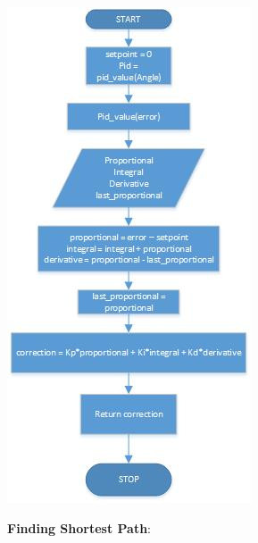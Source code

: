 \documentclass[report]{res}
\begin{document}
	\begin{center}
	\includegraphics[scale = 1.3]{graphics/drawing2.jpg}\\
	\end{center}
	
	\pagebreak
	
	
	\textbf{\Large Finding Shortest Path}:\\ \\
	
\end{document}
